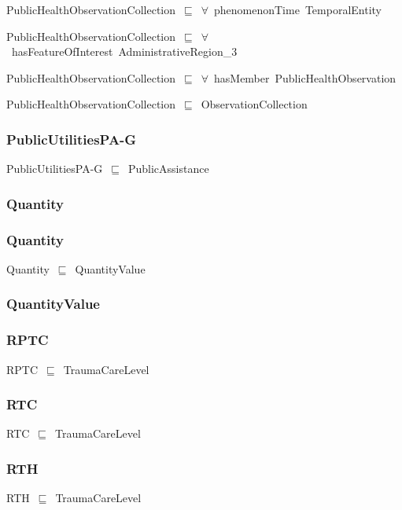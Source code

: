 \documentclass{article}
\begin{document}
PublicHealthObservationCollection~\ensuremath{\sqsubseteq}~\ensuremath{\forall}~phenomenonTime~TemporalEntity~

PublicHealthObservationCollection~\ensuremath{\sqsubseteq}~\ensuremath{\forall}~hasFeatureOfInterest~AdministrativeRegion\_3~

PublicHealthObservationCollection~\ensuremath{\sqsubseteq}~\ensuremath{\forall}~hasMember~PublicHealthObservation~

PublicHealthObservationCollection~\ensuremath{\sqsubseteq}~ObservationCollection~

\subsubsection*{PublicUtilitiesPA-G}

PublicUtilitiesPA-G~\ensuremath{\sqsubseteq}~PublicAssistance~

\subsubsection*{Quantity}

\subsubsection*{Quantity}

Quantity~\ensuremath{\sqsubseteq}~QuantityValue~

\subsubsection*{QuantityValue}

\subsubsection*{RPTC}

RPTC~\ensuremath{\sqsubseteq}~TraumaCareLevel~

\subsubsection*{RTC}

RTC~\ensuremath{\sqsubseteq}~TraumaCareLevel~

\subsubsection*{RTH}

RTH~\ensuremath{\sqsubseteq}~TraumaCareLevel~
\end{document}
